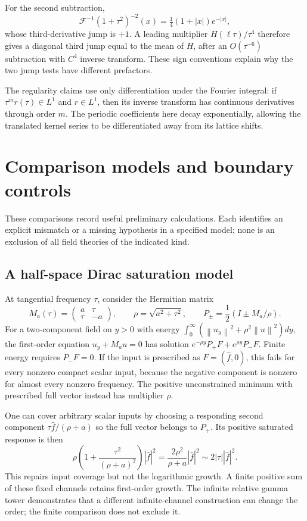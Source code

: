 \documentclass[11pt]{article}
\numberwithin{equation}{section}
\theoremstyle{definition}
\theoremstyle{remark}
\newcommand{\norm}[1]{\left\lVert#1\right\rVert}
\begin{document}
For the second subtraction,
\begin{equation}
 \mathcal F^{-1}(1+\tau^2)^{-2}(x)=\tfrac14(1+|x|)e^{-|x|},
\end{equation}
whose third-derivative jump is $+1$. A leading multiplier $H(\ell\tau)/\tau^4$ therefore gives a diagonal third jump equal to the mean of $H$, after an $O(\tau^{-6})$ subtraction with $C^4$ inverse transform. These sign conventions explain why the two jump tests have different prefactors.

The regularity claims use only differentiation under the Fourier integral: if $\tau^m r(\tau)\in L^1$ and $r\in L^1$, then its inverse transform has continuous derivatives through order $m$. The periodic coefficients here decay exponentially, allowing the translated kernel series to be differentiated away from its lattice shifts.

\section{Comparison models and boundary controls}
\label{app:comparisons}
These comparisons record useful preliminary calculations. Each identifies an explicit mismatch or a missing hypothesis in a specified model; none is an exclusion of all field theories of the indicated kind.

\subsection{A half-space Dirac saturation model}
At tangential frequency $\tau$, consider the Hermitian matrix
\begin{equation}
 M_a(\tau)=\begin{pmatrix}a&\tau\\\tau&-a\end{pmatrix},
 \qquad\rho=\sqrt{a^2+\tau^2},\qquad
 P_\pm=\frac12(I\pm M_a/\rho).
\end{equation}
For a two-component field on $y>0$ with energy
$\int_0^\infty(\norm{u_y}^2+\rho^2\norm u^2)dy$,
the first-order equation $u_y+M_au=0$ has solution
$e^{-\rho y}P_+F+e^{\rho y}P_-F$.
Finite energy requires $P_-F=0$. If the input is prescribed as $F=(\widehat f,0)$, this fails for every nonzero compact scalar input, because the negative component is nonzero for almost every nonzero frequency. The positive unconstrained minimum with prescribed full vector instead has multiplier $\rho$.

One can cover arbitrary scalar inputs by choosing a responding second component $\tau\widehat f/(\rho+a)$ so the full vector belongs to $P_+$. Its positive saturated response is then
\begin{equation}
 \rho\left(1+\frac{\tau^2}{(\rho+a)^2}\right)|\widehat f|^2
 =\frac{2\rho^2}{\rho+a}|\widehat f|^2\sim2|\tau||\widehat f|^2.
\end{equation}
This repairs input coverage but not the logarithmic growth. A finite positive sum of these fixed channels retains first-order growth. The infinite relative gamma tower demonstrates that a different infinite-channel construction can change the order; the finite comparison does not exclude it.
\end{document}
